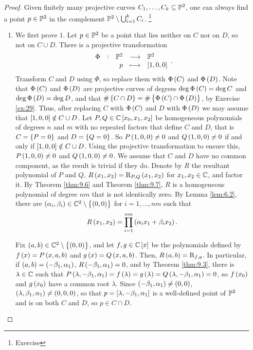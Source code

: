 \begin{proof}
Given finitely many projective curves $ C_1, \dots, C_k \subseteq \mathbb{P}^2 $, one can always find a point $ p \in \mathbb{P}^2 $ in the complement $ \mathbb{P}^2 \setminus \bigcup_{i = 1}^k C_i $. \footnote{Exercise}
\begin{enumerate}
\item We first prove $ 1 $. Let $ p \in \mathbb{P}^2 $ be a point that lies neither on $ C $ nor on $ D $, so not on $ C \cup D $. There is a projective transformation
$$ \function[\Phi]{\PP^2}{\PP^2}{p}{\sbr{1, 0, 0}}. $$
Transform $ C $ and $ D $ using $ \Phi $, so replace them with $ \Phi\br{C} $ and $ \Phi\br{D} $. Note that $ \Phi\br{C} $ and $ \Phi\br{D} $ are projective curves of degrees $ \deg \Phi\br{C} = \deg C $ and $ \deg \Phi\br{D} = \deg D $, and that $ \#\cbr{C \cap D} = \#\cbr{\Phi\br{C} \cap \Phi\br{D}} $, by Exercise \ref{ex:29}. Thus, after replacing $ C $ with $ \Phi\br{C} $ and $ D $ with $ \Phi\br{D} $ we may assume that $ \sbr{1, 0, 0} \notin C \cup D $. Let $ P, Q \in \CC\sbr{x_0, x_1, x_2} $ be homogeneous polynomials of degrees $ n $ and $ m $ with no repeated factors that define $ C $ and $ D $, that is $ C = \cbr{P = 0} $ and $ D = \cbr{Q = 0} $. So $ P\br{1, 0, 0} \ne 0 $ and $ Q\br{1, 0, 0} \ne 0 $ if and only if $ \sbr{1, 0, 0} \notin C \cup D $. Using the projective transformation to ensure this, $ P\br{1, 0, 0} \ne 0 $ and $ Q\br{1, 0, 0} \ne 0 $. We assume that $ C $ and $ D $ have no common component, as the result is trivial if they do. Denote by $ R $ the resultant polynomial of $ P $ and $ Q $, $ R\br{x_1, x_2} = \R_{P, Q}\br{x_1, x_2} $ for $ x_1, x_2 \in \mathbb{C} $, and factor it. By Theorem \ref{thm:9.6} and Theorem \ref{thm:9.7}, $ R $ is a homogeneous polynomial of degree $ nm $ that is not identically zero. By Lemma \ref{lem:6.2}, there are $ \br{\alpha_i, \beta_i} \in \CC^2 \setminus \cbr{\br{0, 0}} $ for $ i = 1, \dots, nm $ such that
$$ R\br{x_1, x_2} = \prod_{i = 1}^{nm} \br{\alpha_ix_1 + \beta_ix_2}. $$

\pagebreak

Fix $ \br{a, b} \in \CC^2 \setminus \cbr{\br{0, 0}} $, and let $ f, g \in \CC\sbr{x} $ be the polynomials defined by $ f\br{x} = P\br{x, a, b} $ and $ g\br{x} = Q\br{x, a, b} $. Then, $ R\br{a, b} = \R_{f, g} $. In particular, if $ \br{a, b} = \br{-\beta_1, \alpha_1} $, $ R\br{-\beta_1, \alpha_1} = 0 $, and by Theorem \ref{thm:9.3}, there is $ \lambda \in \mathbb{C} $ such that $ P\br{\lambda, -\beta_1, \alpha_1} = f\br{\lambda} = g\br{\lambda} = Q\br{\lambda, -\beta_1, \alpha_1} = 0 $, so $ f\br{x_0} $ and $ g\br{x_0} $ have a common root $ \lambda $. Since $ \br{-\beta_1, \alpha_1} \ne \br{0, 0} $, $ \br{\lambda, \beta_1, \alpha_1} \ne \br{0, 0, 0} $, so that $ p = \sbr{\lambda, -\beta_1, \alpha_1} $ is a well-defined point of $ \mathbb{P}^2 $ and is on both $ C $ and $ D $, so $ p \in C \cap D $.


\end{enumerate}
\end{proof}
